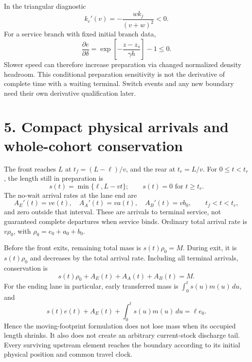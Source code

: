\documentclass[11pt,a4paper]{article}
\begin{document}
In the triangular diagnostic
\[
 k_c'(v)=-\frac{wk_j}{(v+w)^2}<0.
\]
For a service branch with fixed initial branch data,
\[
 \frac{\partial e}{\partial\delta}
 =\exp\left[-\frac{z-z_s}{\gamma h}\right]-1\leq0.
\]
Slower speed can therefore increase preparation via changed normalized
density headroom. This conditional preparation sensitivity is not the
derivative of complete time with a waiting terminal. Switch events and any
new boundary need their own derivative qualification later.

\section*{5. Compact physical arrivals and whole-cohort conservation}
The front reaches $L$ at $t_f=(L-\ell)/v$, and the rear at $t_r=L/v$.
For $0\leq t<t_r$, the length still in preparation is
\[
 s(t)=\min\{\ell,L-vt\};\qquad s(t)=0\text{ for }t\geq t_r.
\]
The no-wait arrival rates at the lane end are
\[
 A_E'(t)=ve(t),\quad A_A'(t)=va(t),\quad A_B'(t)=vb_0,
 \qquad t_f<t<t_r,
 \tag{9}
\]
and zero outside that interval. These are arrivals to terminal service,
not guaranteed complete departures when service binds. Ordinary total
arrival rate is $v\rho_0$, with $\rho_0=e_0+a_0+b_0$.

Before the front exits, remaining total mass is $s(t)\rho_0=M$.
During exit, it is $s(t)\rho_0$ and decreases by the total arrival rate.
Including all terminal arrivals, conservation is
\[
 s(t)\rho_0+ A_E(t)+A_A(t)+A_B(t)=M.
 \tag{10}
\]
For the ending lane in particular, early transferred mass is
$\int_0^t s(u)m(u)\,du$, and
\[
 s(t)e(t)+A_E(t)+\int_0^t s(u)m(u)\,du=\ell e_0.
 \tag{11}
\]
Hence the moving-footprint formulation does not lose mass when its occupied
length shrinks. It also does not create an arbitrary current-stock discharge
tail. Every surviving upstream element reaches the boundary according to its
initial physical position and common travel clock.
\end{document}
